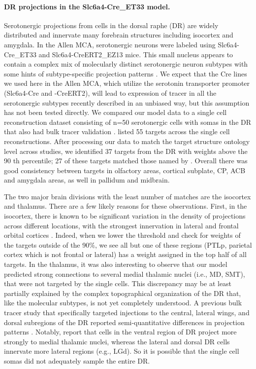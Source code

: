 \paragraph{DR projections in the Slc6a4-Cre\_ET33 model.}

Serotonergic projections from cells in the dorsal raphe (DR) are widely distributed and innervate many forebrain structures including isocortex and amygdala.
In the Allen MCA, serotonergic neurons were labeled using Slc6a4-Cre\_ET33 and Slc6a4-CreERT2\_EZ13 mice.
This small nucleus appears to contain a complex mix of molecularly distinct serotonergic neuron subtypes with some hints of subtype-specific projection patterns \citep{Ren2018-ty, Ren2019-jg,  Huang2019-xh}.
We expect that the Cre lines we used here in the Allen MCA, which utilize the serotonin transporter promoter (Slc6a4-Cre and -CreERT2), will lead to expression of tracer in all the serotonergic subtypes recently described in an unbiased way, but this assumption has not been tested directly.
We compared our model data to a single cell reconstruction dataset consisting of n=50 serotonergic cells with somas in the DR that also had bulk tracer validation .
\citet{ Ren2019-jg} listed 55 targets across the single cell reconstructions.
After processing our data to match the target structure ontology level across studies, we identified 37 targets from the DR with weights above the 90 th percentile; 27 of these targets matched those named by \citet{ Ren2019-jg}.
Overall there was good consistency between targets in olfactory areas, cortical subplate, CP, ACB and amygdala areas, as well in pallidum and midbrain.

The two major brain divisions with the least number of matches are the isocortex and thalamus.
There are a few likely reasons for these observations.
First, in the isocortex, there is known to be significant variation in the density of projections across different locations, with the strongest innervation in lateral and frontal orbital cortices \citet{ Ren2019-jg,}. %
Indeed, when we lower the threshold and check for weights of the targets outside of the 90\%, we see all but one of these regions (PTLp, parietal cortex which is not frontal or lateral) has a weight assigned in the top half of all targets.
In the thalamus, it was also interesting to observe that our model predicted strong connections to several medial thalamic nuclei (i.e., MD, SMT), that were not targeted by the single cells.
This discrepancy may be at least partially explained by the complex topographical organization of the DR that, like the molecular subtypes, is not yet completely understood.
A previous bulk tracer study that specifically targeted injections to the central, lateral wings, and dorsal subregions of the DR reported semi-quantitative differences in projection patterns \citep{Muzerelle2016-sn}.%
Notably, \citet{Muzerelle2016-sn} report that cells in the ventral region of DR project more strongly to medial thalamic nuclei, whereas the lateral and dorsal DR cells innervate more lateral regions (e.g., LGd).
So it is possible that the single cell somas did not adequately sample the entire DR.

